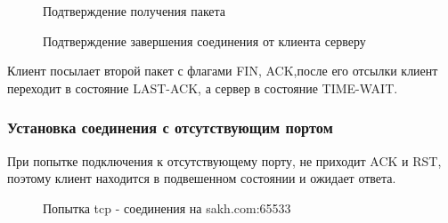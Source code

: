 \documentclass[a4paper, 14pt,russian]{article}
\begin{document}
	\begin{figure}[h!]
		\caption{Подтверждение получения пакета}
		\label{img:tcp_reset}
	\end{figure}

	\newpage

	\begin{figure}[h!]
		\caption{Подтверждение завершения соединения от клиента серверу}
		\label{img:tcp_reset}
	\end{figure}
	Клиент посылает второй пакет с флагами FIN, ACK,после его отсылки клиент переходит в состояние
	LAST-ACK, а сервер в состояние TIME-WAIT.
	
	\subsubsection{Установка соединения с отсутствующим портом}
		При попытке подключения к отсутствующему порту, не приходит ACK и RST, поэтому клиент находится в подвешенном состоянии и ожидает ответа.

		\begin{figure}[h!]
			\caption{Попытка tcp - соединения на sakh.com:65533}
			\label{img:tcp_reset}
		\end{figure}
\end{document}
